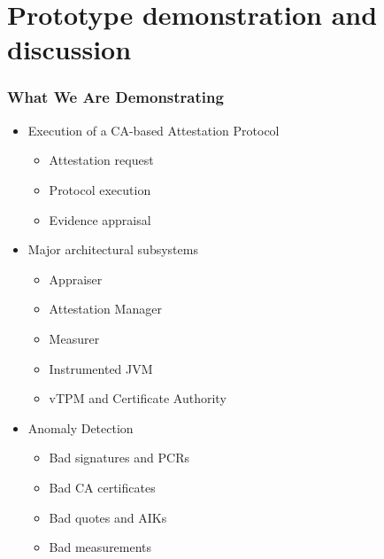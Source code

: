 \documentclass{beamer}
\begin{document}
\section{Prototype demonstration and discussion}

\begin{frame}
  \frametitle{What We Are Demonstrating}
  
  \begin{itemize}
  \item Execution of a CA-based Attestation Protocol
    \begin{itemize}
    \item Attestation request
    \item Protocol execution
    \item Evidence appraisal
    \end{itemize}
  \item Major architectural subsystems
    \begin{itemize}
    \item Appraiser
    \item Attestation Manager
    \item Measurer
    \item Instrumented JVM
    \item vTPM and Certificate Authority
    \end{itemize}
  \item Anomaly Detection
    \begin{itemize}
    \item Bad signatures and PCRs
    \item Bad CA certificates
    \item Bad quotes and AIKs
    \item Bad measurements
    \end{itemize}
  \end{itemize}
\end{frame}
\end{document}
